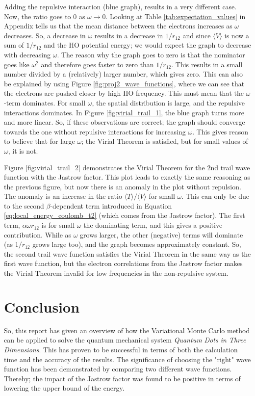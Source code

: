 \documentclass[12pt,english,a4paper]{article}
\begin{document}
Adding the repulsive interaction (blue graph), results in a very different case. Now, the ratio goes to $0$ as $\omega \rightarrow 0$. Looking at Table \ref{tab:expectation_values} in Appendix tells us that the mean distance between the electrons increases as $\omega$ decreases. So, a decrease in $\omega$ results in a decrease in $1/r_{12}$ and since $\langle V\rangle$ is now a sum of $1/r_{12}$ and the HO potential energy; we would expect the graph to decrease with decreasing $\omega$. The reason why the graph goes to zero is that the nominator goes like $\omega^2$ and therefore goes faster to zero than $1/r_{12}$. This results in a small number divided by a (relatively) larger number, which gives zero. This can also be explained by using Figure \ref{fig:proj2_wave_functions}, where we can see that the electrons are pushed closer by high HO frequency. This must mean that the $\omega$-term dominates. For small $\omega$, the spatial distribution is large, and the repulsive interactions dominates. In Figure \ref{fig:virial_trail_1}, the blue  graph turns more and more linear. So, if these observations are correct; the graph should converge towards the one without repulsive interactions for increasing $\omega$. This gives reason to believe that for large $\omega$; the Virial Theorem is satisfied, but for small values of $\omega$, it is not.

Figure \ref{fig:virial_trail_2} demonstrates the Virial Theorem for the 2nd trail wave function with the Jastrow factor. This plot leads to exactly the same reasoning as the previous figure, but now there is an anomaly in the plot without repulsion. The anomaly is an increase in the ratio $\langle T\rangle /\langle V\rangle$ for small $\omega$. This can only be due to the second $\beta$-dependent term introduced in Equation \eqref{eq:local_energy_coulomb_t2} (which comes from the Jastrow factor). The first term, $\alpha\omega r_{12}$ is for small $\omega$ the dominating term, and this gives a positive contribution. While as $\omega$ grows larger, the other (negative) terms will dominate (as $1/r_{12}$ grows large too), and the graph becomes approximately constant. So, the second trail wave function satisfies the Virial Theorem in the same way as the first wave function, but the electron correlations from the Jastrow factor makes the Virial Theorem invalid for low frequencies in the non-repulsive system. 

\section{Conclusion} \label{section:conclusion}
So, this report has given an overview of how the Variational Monte Carlo method can be applied to solve the quantum mechanical system \textit{Quantum Dots in Three Dimensions}. This has proven to be successful in terms of both the calculation time and the accuracy of the results. The significance of choosing the "right" wave function has been demonstrated by comparing two different wave functions. Thereby; the impact of the Jastrow factor was found to be positive in terms of lowering the upper bound of the energy.
\end{document}
